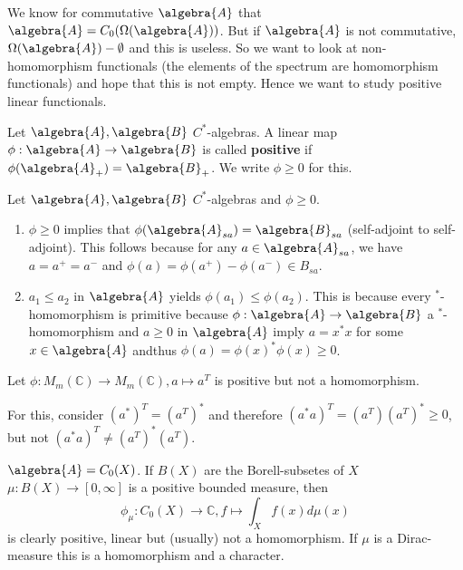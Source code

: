 \documentclass[a4paper]{article}
\begin{document}
We know for commutative $\algebra{A}$ that $\algebra{A} = C_0(\Omega(\algebra{A}))$.
But if $\algebra{A}$ is not commutative, $\Omega(\algebra{A}) - \emptyset$ and this is useless.
So we want to look at non-homomorphism functionals (the elements of the spectrum are homomorphism functionals) and hope that this is not empty. Hence we want to study positive linear functionals.

\begin{definition}
	Let $\algebra{A}, \algebra{B}$ $C^*$-algebras. A linear map $\phi: \algebra{A} \to \algebra{B}$ is called \textbf{positive} if $\phi(\algebra{A}_+) = \algebra{B}_+$.
	We write $\phi \geq 0$ for this.
\end{definition}


\begin{remark}
	Let $\algebra{A}, \algebra{B}$ $C^*$-algebras and $\phi \geq 0$.
	\begin{enumerate}
		\item $\phi \geq 0$ implies that $\phi(\algebra{A}_{sa}) = \algebra{B}_{sa}$ (self-adjoint to self-adjoint).
		This follows because for any $a \in \algebra{A}_{sa}$, we have $a = a^+ = a^-$ and $\phi(a) = \phi(a^+) - \phi(a^-) \in B_{sa}$.
		\item $a_1 \leq a_2$ in $\algebra{A}$ yields $\phi(a_1) \leq \phi(a_2)$. 
		This is because every $^*$-homomorphism is primitive because $\phi: \algebra{A} \to \algebra{B}$ a $^*$-homomorphism and $a \geq 0$ in $\algebra{A}$ imply $a = x^* x$ for some $x \in \algebra{A}$ andthus $\phi(a) = \phi(x)^* \phi(x) \geq 0$.
	\end{enumerate}
\end{remark}


\begin{example}
	Let $\phi: M_m(\mathds{C}) \to M_m(\mathds{C}), a \mapsto a^T$ is positive but not a homomorphism.

	For this, consider $(a^*)^T = (a^T)^*$ and therefore $(a^* a)^T = (a^T) (a^T)^* \geq 0$, but not $(a^* a)^T \neq (a^T)^* (a^T)$.
\end{example}
	
\begin{example}
	$\algebra{A} = C_0(X)$. If $B(X)$ are the Borell-subsetes of $X$ $\mu: B(X) \to [0, \infty]$ is a positive bounded measure, then
	\begin{equation*}
		\phi_\mu: C_0(X) \to \mathds{C}, f \mapsto \int_X f(x) d \mu(x)
	\end{equation*}
	is clearly positive, linear but (usually) not a homomorphism.
	If $\mu$ is a Dirac-measure this is a homomorphism and a character.
\end{example}
\end{document}
